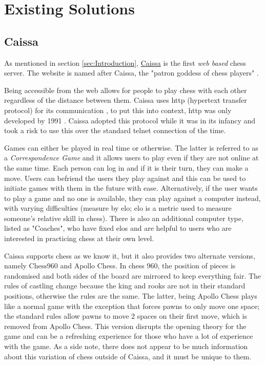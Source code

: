 \section{Existing Solutions}

\subsection{Caissa}
\label{Caissa}

As mentioned in section \ref{sec:Introduction}, \href{https://caissa.com}{Caissa} is the first \emph{web based} chess server. The website is named after Caissa, the "patron goddess of chess players" \cite{WhoIsCaissa}. 

Being accessible from the web allows for people to play chess with each other regardless of the distance between them. Caissa uses http (hypertext transfer protocol) for its communication \cite{CaissaAboutPage}, to put this into context, http was only developed by 1991 \cite{HTTP}. Caissa adopted this protocol while it was in its infancy and took a risk to use this over the standard telnet connection of the time.

\cite{CaissaHomePage} Games can either be played in real time or otherwise. The latter is referred to as a \emph{Correspondence Game} and it allows users to play even if they are not online at the same time. Each person can log in and if it is their turn, they can make a move. Users can befriend the users they play against and this can be used to initiate games with them in the future with ease. Alternatively, if the user wants to play a game and no one is available, they can play against a computer instead, with varying difficulties (measure by elo; elo is a metric used to measure someone's relative skill in chess). There is also an additional computer type, listed as "Coaches", who have fixed elos and are helpful to users who are interested in practicing chess at their own level.

Caissa supports chess as we know it, but it also provides two alternate versions, namely Chess960 and Apollo Chess. In chess 960, the position of pieces is randomised and both sides of the board are mirrored to keep everything fair. The rules of castling change because the king and rooks are not in their standard positions, otherwise the rules are the same. The latter, being Apollo Chess plays like a normal game with the exception that forces pawns to only move one space; the standard rules allow pawns to move 2 spaces on their first move, which is removed from Apollo Chess. This version disrupts the opening theory for the game and can be a refreshing experience for those who have a lot of experience with the game. As a side note, there does not appear to be much information about this variation of chess outside of Caissa, and it must be unique to them.


